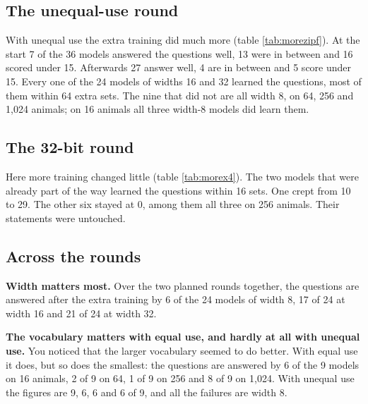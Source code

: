 \subsection*{The unequal-use round}

\begin{table}[H]
\centering\small

\caption{Unequal use. The question score of the three repeats, at the start of the extra
training and after 16 to 256 more sets.}
\label{tab:morezipf}
\end{table}

With unequal use the extra training did much more (table \ref{tab:morezipf}). At the start 7
of the 36 models answered the questions well, 13 were in between and 16 scored under 15.
Afterwards 27 answer well, 4 are in between and 5 score under 15. Every one of the 24 models
of widths 16 and 32 learned the questions, most of them within 64 extra sets. The nine that
did not are all width 8, on 64, 256 and 1,024 animals; on 16 animals all three width-8 models
did learn them.

\subsection*{The 32-bit round}

\begin{table}[H]
\centering\small

\caption{The nine models of the 32-bit round that knew the statements, trained on for 64 more
sets. A set of this round is four times as long, so 64 sets are as much text as 256 sets of
the other rounds.}
\label{tab:morex4}
\end{table}

Here more training changed little (table \ref{tab:morex4}). The two models that were already
part of the way learned the questions within 16 sets. One crept from 10 to 29. The other six
stayed at 0, among them all three on 256 animals. Their statements were untouched.

\subsection*{Across the rounds}

\textbf{Width matters most.} Over the two planned rounds together, the questions are answered
after the extra training by 6 of the 24 models of width 8, 17 of 24 at width 16 and 21 of 24
at width 32.

\textbf{The vocabulary matters with equal use, and hardly at all with unequal use.} You
noticed that the larger vocabulary seemed to do better. With equal use it does, but so does
the smallest: the questions are answered by 6 of the 9 models on 16 animals, 2 of 9 on 64, 1
of 9 on 256 and 8 of 9 on 1,024. With unequal use the figures are 9, 6, 6 and 6 of 9, and all
the failures are width 8.

